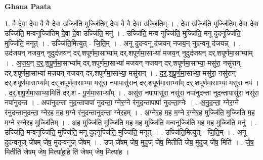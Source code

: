 \documentclass[17pt]{extarticle}
\begin{document}
\textbf{Ghana Paata } \newline

1. वै दे॒वा दे॒वा वै वै दे॒वा उज्जि॑ति॒ मुज्जि॑तिम् दे॒वा वै वै दे॒वा उज्जि॑तिम् । . दे॒वा उज्जि॑ति॒ मुज्जि॑तिम् दे॒वा दे॒वा उज्जि॑ति॒ मन्वनूज्जि॑तिम् दे॒वा दे॒वा उज्जि॑ति॒ मनु॑ । . उज्जि॑ति॒ मन्व नूज्जि॑ति॒ मुज्जि॑ति॒ मनू दुदनूज्जि॑ति॒ मुज्जि॑ति॒ मनूत् । . उज्जि॑ति॒मित्युत् - जि॒ति॒म् । . अनू दुदन्वनू द॑जयन् नजय॒न् नुदन्वनू द॑जयन्न् । . उद॑जयन् नजय॒न् नुदुद॑जयन् दर्.शपूर्णमा॒साभ्या᳚म् दर्.शपूर्णमा॒साभ्या॑ मजय॒न् नुदुद॑जयन् दर्.शपूर्णमा॒साभ्या᳚म् । . अ॒ज॒य॒न् द॒र्॒.श॒पू॒र्ण॒मा॒साभ्या᳚म् दर्.शपूर्णमा॒साभ्या॑ मजयन् नजयन् दर्.शपूर्णमा॒साभ्या॒ मसु॑रा॒ नसु॑रान् दर्.शपूर्णमा॒साभ्या॑ मजयन् नजयन् दर्.शपूर्णमा॒साभ्या॒ मसु॑रान् । . द॒र्॒.श॒पू॒र्ण॒मा॒साभ्या॒ मसु॑रा॒ नसु॑रान् दर्.शपूर्णमा॒साभ्या᳚म् दर्.शपूर्णमा॒साभ्या॒ मसु॑रा॒ नपापासु॑रान् दर्.शपूर्णमा॒साभ्या᳚म् दर्.शपूर्णमा॒साभ्या॒ मसु॑रा॒ नप॑ । . द॒र्॒.श॒पू॒र्ण॒मा॒साभ्या॒मिति॑ दर्.श - पू॒र्ण॒मा॒साभ्या᳚म् । . असु॑रा॒ नपापासु॑रा॒ नसु॑रा॒ नपा॑नुदन्ता नुद॒न्तापासु॑रा॒ नसु॑रा॒ नपा॑नुदन्त । . अपा॑नुदन्ता नुद॒न्तापापा॑ नुदन्ता॒ ग्नेर॒ग्ने र॑नुद॒न्तापापा॑ नुदन्ता॒ग्नेः । . अ॒नु॒द॒न्ता॒ ग्नेर॒ग्ने र॑नुदन्तानुदन्ता॒ ग्नेर॒ह म॒ह म॒ग्ने र॑नुदन्तानुदन्ता॒ ग्नेर॒हम् । . अ॒ग्नेर॒ह म॒ह म॒ग्ने र॒ग्नेर॒ह मुज्जि॑ति॒ मुज्जि॑ति म॒ह म॒ग्ने र॒ग्नेर॒ह मुज्जि॑तिम् । . अ॒ह मुज्जि॑ति॒ मुज्जि॑ति म॒ह म॒ह मुज्जि॑ति॒ मन्वनूज्जि॑ति म॒ह म॒ह मुज्जि॑ति॒ मनु॑ । . उज्जि॑ति॒ मन्वनूज्जि॑ति॒ मुज्जि॑ति॒ मनू दुदनूज्जि॑ति॒ मुज्जि॑ति॒ मनूत् । . उज्जि॑ति॒मित्युत् - जि॒ति॒म् । . अनू दुदन्वनूज् जे॑षम् जेष॒ मुदन्वनूज् जे॑षम् । . उज् जे॑षम् जेष॒ मुदुज् जे॑ष॒ मितीति॑ जेष॒ मुदुज् जे॑ष॒ मिति॑ । . जे॒ष॒ मितीति॑ जेषम् जेष॒ मित्या॑हा॒हे ति॑ जेषम् जेष॒ मित्या॑ह । \newline
\end{document}
